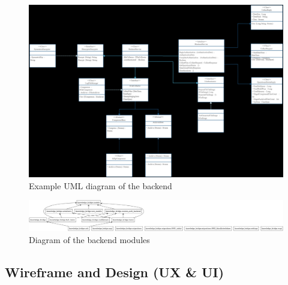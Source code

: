 \documentclass[12pt,a4paper]{article}
\begin{document}
\begin{spacing}{1.5}
    \begin{figure}[H]
        \centering
        \includegraphics[width=1\linewidth]{assets/backend-uml-example.png}
        \caption{Example UML diagram of the backend}
        \label{fig:backend-uml}
    \end{figure}
    \FloatBarrier

    \begin{figure}[H]
        \centering
        \includegraphics[width=1\linewidth]{assets/KnowledgeBridgePackages.png}
        \caption{Diagram of the backend modules}
        \label{fig:backend-modules}
    \end{figure}
    \FloatBarrier

    \newpage
    \subsection{Wireframe and Design (UX \& UI)}\label{subseq:wireframe-and-design}

\end{spacing}
\end{document}
